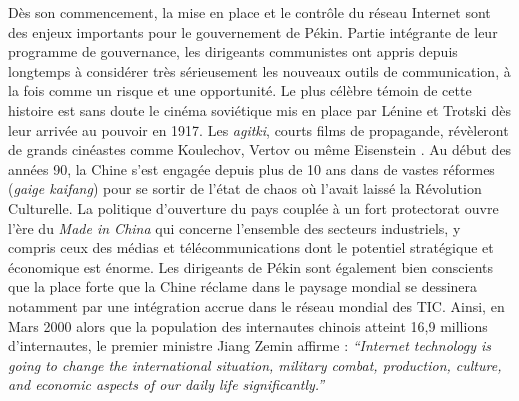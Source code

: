 Dès son commencement, la mise en place et le contrôle du réseau Internet sont des enjeux importants pour le gouvernement de Pékin. Partie intégrante de leur programme de gouvernance, les dirigeants communistes ont appris depuis longtemps à considérer très sérieusement les nouveaux outils de communication, à la fois comme un risque et une opportunité. Le plus célèbre témoin de cette histoire est sans doute le cinéma soviétique mis en place par Lénine et Trotski dès leur arrivée au pouvoir en 1917. Les \textit{agitki}, courts films de propagande, révèleront de grands cinéastes comme Koulechov, Vertov ou même Eisenstein \citep{Mazuy2002}. Au début des années 90, la Chine s’est engagée depuis plus de 10 ans dans de vastes réformes (\textit{gaige kaifang}) pour se sortir de l’état de chaos où l’avait laissé la Révolution Culturelle. La politique d’ouverture du pays couplée à un fort protectorat ouvre l’ère du \textit{Made in China} qui concerne l’ensemble des secteurs industriels, y compris ceux des médias et télécommunications dont le potentiel stratégique et économique est énorme. Les dirigeants de Pékin sont également bien conscients que la place forte que la Chine réclame dans le paysage mondial se dessinera notamment par une intégration accrue dans le réseau mondial des TIC. Ainsi, en Mars 2000 alors que la population des internautes chinois atteint 16,9 millions d’internautes, le premier ministre Jiang Zemin affirme : \textit{“Internet technology is going to change the international situation, military combat, production, culture, and economic aspects of our daily life significantly.”} \citep{Foster2000}

